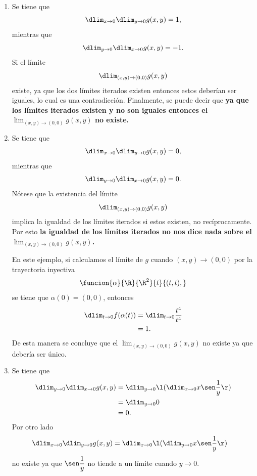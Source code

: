 \documentclass[a4,11pt]{aleph-examen}
\begin{document}
\begin{preguntas}
\begin{respuesta}
\begin{respuesta}
    \begin{enumerate}
        \item 
            Se tiene que
            \[
                \dlim_{x\to 0}\dlim_{y\to 0}g(x,y)=1,
            \]
            mientras que
            \[
                \dlim_{y\to 0}\dlim_{x\to 0}g(x,y)=-1.
            \]
            Si el límite
            \[
                \dlim_{(x,y)\to (0,0)}g(x,y)
            \]
            existe, ya que los dos límites iterados existen entonces estos deberían ser iguales, lo cual es una contradicción. Finalmente, se puede decir  que \textbf{ya que los límites iterados existen y no son iguales entonces el \boldmath$\lim_{(x,y)\to (0,0)}g(x,y)$ no existe.} 
            
        \item
            Se tiene que
            \[
                \dlim_{x\to 0}\dlim_{y\to 0}g(x,y)=0,
            \]
            mientras que
            \[
                \dlim_{y\to 0}\dlim_{x\to 0}g(x,y)=0.
            \]
            Nótese que la existencia del límite 
            \[
                \dlim_{(x,y)\to (0,0)}g(x,y)
            \]
            implica la igualdad de los límites iterados si estos existen, no recíprocamente. Por esto \textbf{la igualdad de los límites iterados no nos dice nada sobre el \boldmath$\lim_{(x,y)\to (0,0)}g(x,y)$.} 
            
            En este ejemplo, si calculamos el límite de $g$ cuando $(x,y)\to (0,0)$ por la trayectoria inyectiva
            \[
                \funcion{\alpha}{\R}{\R^2}{t}{(t,t),}
            \]
            se tiene que $\alpha(0)=(0,0)$, entonces
            \begin{align*}
                \dlim_{t\to 0}f(\alpha(t))&=\dlim_{t\to 0}\dfrac{t^4}{t^4}\\
                &=1.
            \end{align*}
            De esta manera se concluye que el $\lim_{(x,y)\to (0,0)}g(x,y)$ no existe ya que debería ser único.
            
        \item   
            Se tiene que 
            \begin{align*}
                \dlim_{y\to 0}\dlim_{x\to 0}g(x,y)&=\dlim_{y\to 0}\l(\dlim_{x\to 0} x\sen \dfrac{1}{y} \r)\\
                &=\dlim_{y\to 0}0\\
                &=0.
            \end{align*}
            Por otro lado
            \begin{align*}
                \dlim_{x\to 0}\dlim_{y\to 0}g(x,y)&=\dlim_{x\to 0}\l(\dlim_{y\to 0} x\sen \dfrac{1}{y} \r)
            \end{align*}
            no existe ya que $\sen \dfrac{1}{y}$ no tiende a un límite cuando $y\to 0$.
            

\end{enumerate}
\end{respuesta}
\end{respuesta}
\end{preguntas}
\end{document}

